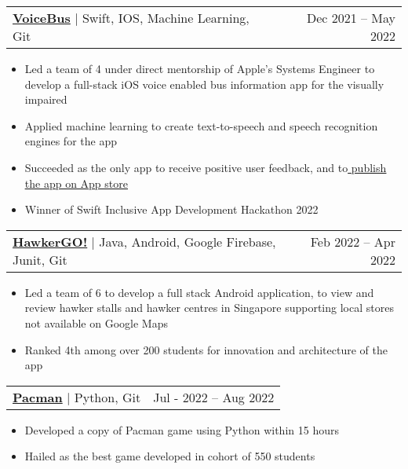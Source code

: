 \documentclass[letterpaper,11pt]{article}
\makeatletter
\newcommand{\resumeItem}[1]{
  \item\small{
    {#1 \vspace{-2.5pt}}
  }
}
\newcommand{\resumeProjectHeading}[2]{
    \item
    \begin{tabular*}{0.97\textwidth}{l@{\extracolsep{\fill}}r}
      \small#1 & \footnotesize#2 \\
    \end{tabular*}\vspace{-7pt}
}
\newcommand{\resumeItemListStart}{\begin{itemize}}
\newcommand{\resumeItemListEnd}{\end{itemize}\vspace{-5pt}}
\makeatother
\begin{document}
    
      \resumeProjectHeading
          {\textbf{{\href{https://github.com/Usgupta/voicebus}{\faExternalLink* VoiceBus}}} $|$ {Swift, IOS, Machine Learning, Git}}{\footnotesize	{Dec 2021 -- May 2022}}
          \resumeItemListStart
            \resumeItem{Led a team of 4 under direct mentorship of Apple's Systems Engineer to develop a full-stack iOS voice enabled bus information app for the visually impaired}
            \resumeItem{Applied machine learning to create text-to-speech and speech recognition engines for the app}
            \resumeItem{Succeeded as the only app to receive positive user feedback, and to\href{https://apps.apple.com/app/voicebus/id1624028704}{ \underline{publish the app on App store}}}
            \resumeItem{Winner of Swift Inclusive App Development Hackathon 2022}
           
          \resumeItemListEnd

          \resumeProjectHeading
          {\textbf{{\href{https://github.com/Usgupta/HawkerGO}{\faExternalLink* HawkerGO!}}} $|$ {Java, Android, Google Firebase, Junit, Git}}{\footnotesize	{Feb 2022 -- Apr 2022}}
          
          \resumeItemListStart
            \resumeItem{Led a team of 6 to develop a full stack Android application, to view and review hawker stalls and hawker centres in Singapore supporting local stores not available on Google Maps}
            \resumeItem{Ranked 4th among over 200 students for innovation and architecture of the app}
          \resumeItemListEnd
        
          
          \resumeProjectHeading
            {\textbf{{\href{https://github.com/Usgupta/Pacman-The-Game}{\faExternalLink* Pacman}}} $|$ {Python, Git}}{\footnotesize	{Jul - 2022 -- Aug 2022}}
          \resumeItemListStart
            \resumeItem{Developed a copy of Pacman game using Python within 15 hours}
            \resumeItem{Hailed as the best game developed in cohort of 550 students}
          \resumeItemListEnd
          
\end{document}
